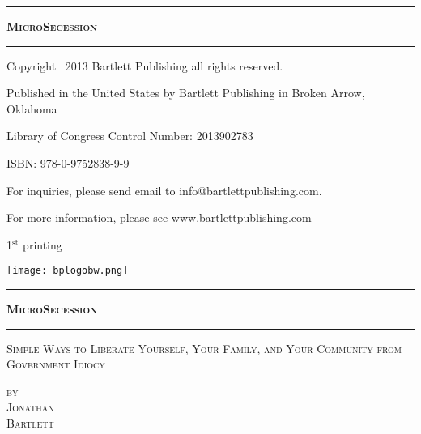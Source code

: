\begin{titlepage}

\thispagestyle{empty}
\vspace*{\fill}
\begin{center}
\hrule
{\LARGE \textsc{\textbf{MicroSecession}}}
\baselineskip
\hrule
\end{center}
\vspace*{\fill}

\clearpage %

\thispagestyle{empty}
\vspace*{\fill}

{\small
Copyright \textcopyright\ 2013 Bartlett Publishing all rights reserved.

Published in the United States by Bartlett Publishing in Broken Arrow, Oklahoma

Library of Congress Control Number: 2013902783

ISBN: 978-0-9752838-9-9

For inquiries, please send email to info@bartlettpublishing.com.

For more information, please see www.bartlettpublishing.com

1$^{\textrm{st}}$ printing
}
\baselineskip

\texttt{[image: bplogobw.png]}


\vspace*{\fill}

\clearpage %

\thispagestyle{empty}
\vspace*{\fill}
\begin{center}
\hrule
{\LARGE \textsc{\textbf{MicroSecession}}}
\baselineskip
\hrule
{}\baselineskip
{\Large \textsc{Simple Ways to Liberate Yourself, Your Family, and Your Community from Government Idiocy}}

\baselineskip

{\LARGE 
	{\textsc{ 
		\hfill by \hspace*{1in} \\ 
		\hfill Jonathan \hspace*{1in} \\ 
		\hfill Bartlett \hspace*{1in} \\
	} }
}

\end{center}

\vspace*{\fill}


\end{titlepage}

